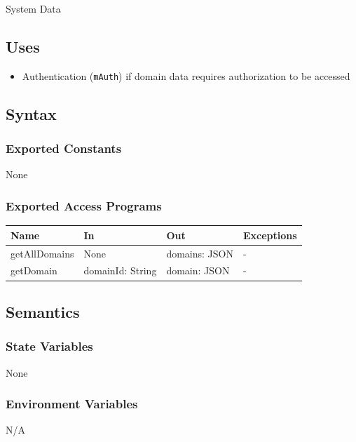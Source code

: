 \documentclass[12pt, titlepage]{article}
\begin{document}
System Data

\subsection{Uses}
\begin{itemize}
  \item Authentication (\texttt{mAuth}) if domain data requires authorization to be accessed
\end{itemize}

\subsection{Syntax}

\subsubsection{Exported Constants}

None

\subsubsection{Exported Access Programs}

\begin{center}
\begin{tabular}{p{3cm} p{4cm} p{4cm} p{2cm}}
\hline
\textbf{Name} & \textbf{In} & \textbf{Out} & \textbf{Exceptions} \\
\hline
getAllDomains & None & domains: JSON & - \\
getDomain & domainId: String & domain: JSON & - \\
\hline
\end{tabular}
\end{center}

\subsection{Semantics}

\subsubsection{State Variables}

None

\subsubsection{Environment Variables}

N/A
\end{document}
